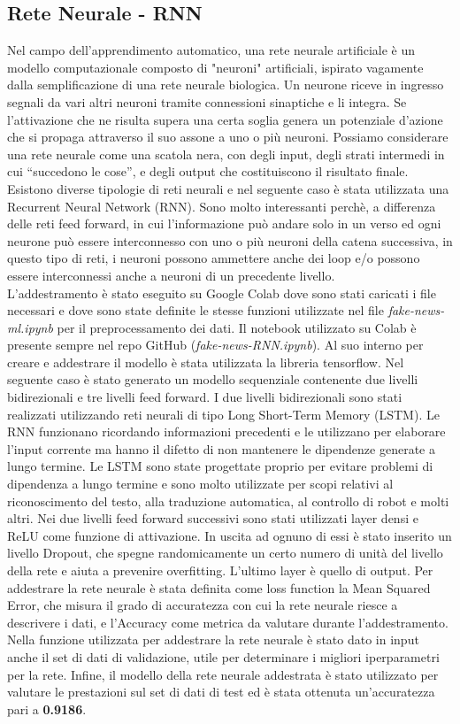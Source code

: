 \documentclass{article}
\begin{document}
\subsection{Rete Neurale - RNN}
Nel campo dell'apprendimento automatico, una rete neurale artificiale è un modello computazionale composto di "neuroni" artificiali, ispirato vagamente dalla semplificazione di una rete neurale biologica.
Un neurone riceve in ingresso segnali da vari altri neuroni tramite connessioni sinaptiche e li integra. Se l’attivazione che ne risulta supera una certa soglia genera un potenziale d’azione che si propaga attraverso il suo assone a uno o più neuroni. Possiamo considerare una rete neurale come una scatola nera, con degli input, degli strati intermedi in cui “succedono le cose”, e degli output che costituiscono il risultato finale. Esistono diverse tipologie di reti neurali e nel seguente caso è stata utilizzata una Recurrent Neural Network (RNN). Sono molto interessanti perchè, a differenza delle reti feed forward, in cui l’informazione può andare solo in un verso ed ogni neurone può essere interconnesso con uno o più neuroni della catena successiva, in questo tipo di reti, i neuroni  possono ammettere anche dei loop e/o possono essere interconnessi anche a neuroni di un precedente livello. \\
L'addestramento è stato eseguito su Google Colab dove sono stati caricati i file necessari e dove sono state definite le stesse funzioni utilizzate nel file \textit{fake-news-ml.ipynb} per il preprocessamento dei dati. Il notebook utilizzato su Colab è presente sempre nel repo GitHub (\textit{fake-news-RNN.ipynb}). Al suo interno per creare e addestrare il modello è stata utilizzata la libreria tensorflow. 
Nel seguente caso è stato generato un modello sequenziale contenente due livelli bidirezionali e tre livelli feed forward. I due livelli bidirezionali sono stati realizzati utilizzando reti neurali di tipo Long Short-Term Memory (LSTM). Le RNN funzionano ricordando informazioni precedenti e le utilizzano per elaborare l'input corrente ma hanno il difetto di non mantenere le dipendenze generate a lungo termine. Le LSTM sono state progettate proprio per evitare problemi di dipendenza a lungo termine e sono molto utilizzate per scopi relativi al riconoscimento del testo, alla traduzione automatica, al controllo di robot e molti altri.
Nei due livelli feed forward successivi sono stati utilizzati layer densi e ReLU come funzione di attivazione. In uscita ad ognuno di essi è stato inserito un livello Dropout, che spegne randomicamente un certo numero di unità del livello della rete e aiuta a prevenire overfitting. L'ultimo layer è quello di output.
Per addestrare la rete neurale è stata definita come loss function la Mean Squared Error, che misura il grado di accuratezza con cui la rete neurale riesce a descrivere i dati, e l'Accuracy come metrica da valutare durante l'addestramento. Nella funzione utilizzata per addestrare la rete neurale è stato dato in input anche il set di dati di validazione, utile per determinare i migliori iperparametri per la rete. Infine, il modello della rete neurale addestrata è stato utilizzato per valutare le prestazioni sul set di dati di test ed è stata ottenuta un'accuratezza pari a \textbf{0.9186}.
\end{document}

